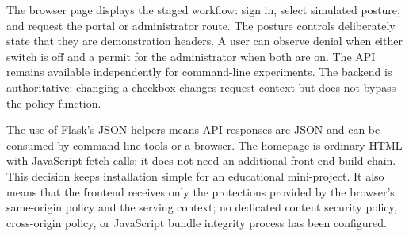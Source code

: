 The browser page displays the staged workflow: sign in, select simulated posture, and request the portal or administrator route. The posture controls deliberately state that they are demonstration headers. A user can observe denial when either switch is off and a permit for the administrator when both are on. The API remains available independently for command-line experiments. The backend is authoritative: changing a checkbox changes request context but does not bypass the policy function.

The use of Flask's JSON helpers means API responses are JSON and can be consumed by command-line tools or a browser. The homepage is ordinary HTML with JavaScript fetch calls; it does not need an additional front-end build chain. This decision keeps installation simple for an educational mini-project. It also means that the frontend receives only the protections provided by the browser's same-origin policy and the serving context; no dedicated content security policy, cross-origin policy, or JavaScript bundle integrity process has been configured.

